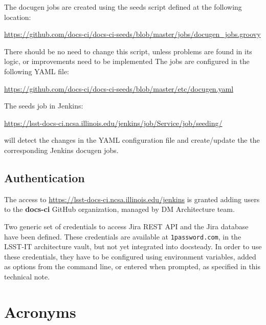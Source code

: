 \documentclass[DM]{lsstdoc}
\begin{document}
The docugen jobs are created using the seeds script defined at the following location:

\url{https://github.com/docs-ci/docs-ci-seeds/blob/master/jobs/docugen_jobs.groovy}

There should be no need to change this script, unless problems are found in its logic, or improvements need to be implemented
The jobs are configured in the following YAML file:

\url{https://github.com/docs-ci/docs-ci-seeds/blob/master/etc/docugen.yaml}

The seeds job in Jenkins:

\url{https://lsst-docs-ci.ncsa.illinois.edu/jenkins/job/Service/job/seeding/}

will detect the changes in the YAML configuration file and create/update the the corresponding Jenkins docugen jobs.



\subsection{Authentication}\label{sec:auth}

The access to \url{https://lsst-docs-ci.ncsa.illinois.edu/jenkins} is granted adding users to the \textbf{docs-ci} GitHub organization, 
managed by DM Architecture team.

Two generic set of credentials to access Jira REST API and the Jira database have been defined.
These credentials are available at \texttt{1password.com}, in the LSST-IT architecture vault, but not yet integrated into docsteady.
In order to use these credentials, they have to be configured using environment variables, added as options from the command line, or entered when prompted, as specified in this technical note.




\appendix
\section{Acronyms} \label{sec:acronyms}
\end{document}
